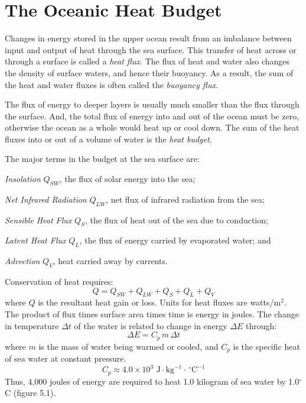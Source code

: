\section{The Oceanic Heat Budget}
Changes in energy stored in the upper ocean result from an imbalance between input and output of heat through the sea surface. This transfer of heat across or through a surface is called a \textit{heat flux}. The flux of heat and water also changes the density of surface waters, and hence their buoyancy. As a result, the sum of the heat and water fluxes is often called the \textit{buoyancy flux}.

The flux of energy to deeper layers is usually much smaller than the flux through the surface. And,
the total flux of energy into and out of the ocean must be zero, otherwise the ocean as a whole would heat up or cool down. The sum of the heat fluxes into or out of a volume of water is the \textit{heat
budget}.

The major terms in the budget at the sea surface are:
\begin{enumerate}
\vitem \textit{Insolation} $Q_{SW}$, the flux of solar energy into the sea; 

\vitem \textit{Net Infrared Radiation} $Q_{LW}$, net flux of infrared radiation from the sea;

\vitem \textit{Sensible Heat Flux} $Q_S$, the flux
of heat out of the sea due to conduction; 

\vitem \textit{Latent Heat Flux}
$Q_L$, the flux of energy carried by evaporated water;
and 

\vitem \textit{Advection} $Q_V$, heat carried away by
currents.
\end{enumerate}

Conservation of heat requires:
\begin{equation}Q = Q_{SW} + Q_{LW} + Q_S + Q_L + Q_V \end{equation}
where $Q$ is the resultant heat gain or loss. Units for heat fluxes
are watts/m$^2$. The product of flux times surface area times time is energy in
joules. The change in temperature $\Delta t$ of the water is related to change in
energy $\Delta E$ through:
\begin{equation}
\Delta E = C_{p} \, m \, \Delta t
\end{equation}
where $m$ is the mass of water being warmed or cooled, and $C_p$ is the specific
heat of sea water at constant pressure.
\begin{equation}
C_{p} \approx 4.0\times 10^{3} \mbox{ J}\cdot \mbox{kg}^{-1} \cdot \, ^\circ
\mbox{C}^{-1}
\end{equation}
Thus, 4,000 joules of energy are required to heat 1.0 kilogram of sea water by
1.0$^{\circ}$C (figure 5.1).

